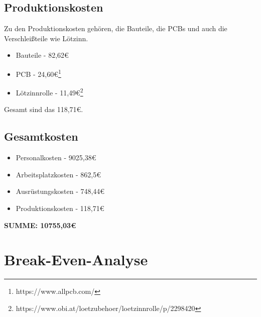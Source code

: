 \documentclass[paper=a4, 12pt]{scrreprt}
\begin{document}
		\subsection{Produktionskosten}\hfill \break
		Zu den Produktionskosten gehören, die Bauteile, die PCBs und auch die Verschleißteile wie Lötzinn.
		\begin{itemize}
			\item Bauteile - 82,62€
			\item PCB - 24,60€\footnote{https://www.allpcb.com/}
			\item Lötzinnrolle - 11,49€\footnote{https://www.obi.at/loetzubehoer/loetzinnrolle/p/2298420}
		\end{itemize}
		Gesamt sind das 118,71€.
		
		\subsection{Gesamtkosten}\hfill \break
		\begin{itemize}
			\item Personalkosten - 9025,38€
			\item Arbeitsplatzkosten - 862,5€
			\item Ausrüstungskosten - 748,44€
			\item Produktionskosten - 118,71€
		\end{itemize}
		\textbf{SUMME: 10755,03€}
		\newpage	
	
	\section{Break-Even-Analyse}\hfill \break
\end{document}
